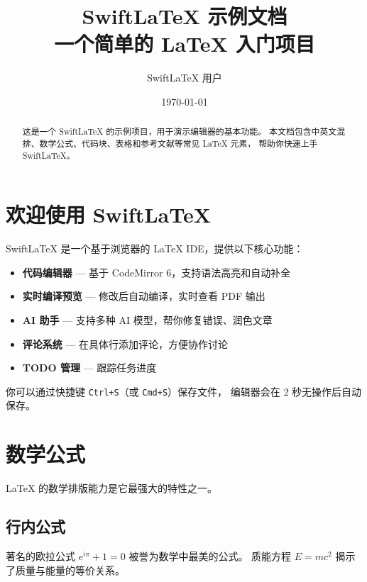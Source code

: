 \documentclass[12pt, a4paper]{article}
\title{\textbf{SwiftLaTeX 示例文档} \\ \large 一个简单的 \LaTeX{} 入门项目}
\author{SwiftLaTeX 用户}
\date{\today}
\begin{document}
\maketitle

\begin{abstract}
这是一个 SwiftLaTeX 的示例项目，用于演示编辑器的基本功能。
本文档包含中英文混排、数学公式、代码块、表格和参考文献等常见 \LaTeX{} 元素，
帮助你快速上手 SwiftLaTeX。
\end{abstract}

\tableofcontents
\newpage

\section{欢迎使用 SwiftLaTeX}

SwiftLaTeX 是一个基于浏览器的 \LaTeX{} IDE，提供以下核心功能：

\begin{itemize}
    \item \textbf{代码编辑器} — 基于 CodeMirror 6，支持语法高亮和自动补全
    \item \textbf{实时编译预览} — 修改后自动编译，实时查看 PDF 输出
    \item \textbf{AI 助手} — 支持多种 AI 模型，帮你修复错误、润色文章
    \item \textbf{评论系统} — 在具体行添加评论，方便协作讨论
    \item \textbf{TODO 管理} — 跟踪任务进度
\end{itemize}

你可以通过快捷键 \texttt{Ctrl+S}（或 \texttt{Cmd+S}）保存文件，
编辑器会在 2 秒无操作后自动保存。

\section{数学公式}

\LaTeX{} 的数学排版能力是它最强大的特性之一。

\subsection{行内公式}

著名的欧拉公式 $e^{i\pi} + 1 = 0$ 被誉为数学中最美的公式。
质能方程 $E = mc^2$ 揭示了质量与能量的等价关系。
\end{document}
